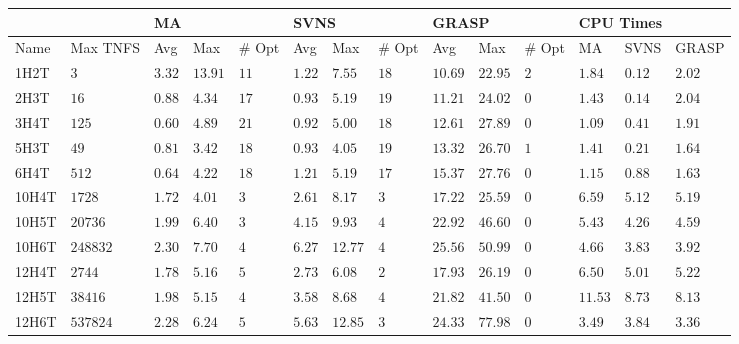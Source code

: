 \begin{center}
    \begin{table}[]
    \centering
    \begin{adjustwidth}{-1in}{-1in}
    \begin{tabular}{|ll|lll|lll|lll|lll|}
\hline
\multicolumn{2}{|l}{} & \multicolumn{3}{|l}{MA} & \multicolumn{3}{|l}{SVNS} & \multicolumn{3}{|l}{GRASP} & \multicolumn{3}{|l|}{CPU Times} \\
\hline
Name & Max TNFS & Avg & Max & \# Opt & Avg & Max & \# Opt & Avg & Max & \# Opt & MA & SVNS & GRASP \\
1H2T  & $3                $ & $3.32$ & $13.91$ & $11$  & $1.22 $ & $7.55 $ & $18$  & $10.69$  & $22.95$  & $2$   & $1.84 $ & $0.12 $ & $2.02 $ \\
2H3T  & $16               $ & $0.88$ & $4.34 $ & $17$  & $0.93 $ & $5.19 $ & $19$  & $11.21$  & $24.02$  & $0$   & $1.43 $ & $0.14 $ & $2.04 $ \\
3H4T  & $125              $ & $0.60$ & $4.89 $ & $21$  & $0.92 $ & $5.00 $ & $18$  & $12.61$  & $27.89$  & $0$   & $1.09 $ & $0.41 $ & $1.91 $ \\
5H3T  & $49               $ & $0.81$ & $3.42 $ & $18$  & $0.93 $ & $4.05 $ & $19$  & $13.32$  & $26.70$  & $1$   & $1.41 $ & $0.21 $ & $1.64 $ \\
6H4T  & $512              $ & $0.64$ & $4.22 $ & $18$  & $1.21 $ & $5.19 $ & $17$  & $15.37$  & $27.76$  & $0$   & $1.15 $ & $0.88 $ & $1.63 $ \\
10H4T & $1728             $ & $1.72$ & $4.01 $ & $3 $  & $2.61 $ & $8.17 $ & $3 $  & $17.22$  & $25.59$  & $0$   & $6.59 $ & $5.12 $ & $5.19 $ \\
10H5T & $20736            $ & $1.99$ & $6.40 $ & $3 $  & $4.15 $ & $9.93 $ & $4 $  & $22.92$  & $46.60$  & $0$   & $5.43 $ & $4.26 $ & $4.59 $ \\
10H6T & $248832           $ & $2.30$ & $7.70 $ & $4 $  & $6.27 $ & $12.77$ & $4 $  & $25.56$  & $50.99$  & $0$   & $4.66 $ & $3.83 $ & $3.92 $ \\
12H4T & $2744             $ & $1.78$ & $5.16 $ & $5 $  & $2.73 $ & $6.08 $ & $2 $  & $17.93$  & $26.19$  & $0$   & $6.50 $ & $5.01 $ & $5.22 $ \\
12H5T & $38416            $ & $1.98$ & $5.15 $ & $4 $  & $3.58 $ & $8.68 $ & $4 $  & $21.82$  & $41.50$  & $0$   & $11.53$ & $8.73 $ & $8.13 $ \\
12H6T & $537824           $ & $2.28$ & $6.24 $ & $5 $  & $5.63 $ & $12.85$ & $3 $  & $24.33$  & $77.98$  & $0$   & $3.49 $ & $3.84 $ & $3.36 $ \\

\end{tabular}
\end{adjustwidth}
\end{table}
\end{center}
